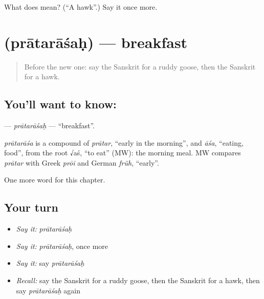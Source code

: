 \begin{tcolorbox}[breakable,colback=teal!4,colframe=teal!35!black,title={Before you move on}]
What does  mean? (\textquotedblleft{}A hawk\textquotedblright{}.) Say it once more.
\end{tcolorbox}
\section[\texorpdfstring{\sk{प्रातराशः} (prātarāśaḥ)}{प्रातराशः (prātarāśaḥ)}]{ (prātarāśaḥ) — breakfast}

\label{lesson:SA-C254-pratarasah}



\begin{quote}
Before the new one: say the Sanskrit for a ruddy goose, then the Sanskrit for a hawk.
\end{quote}

\subsection*{You'll want to know: }
\textbf{} — \emph{prātarāśaḥ} — \textquotedblleft{}breakfast\textquotedblright{}.

\begin{cousinweb}
\emph{prātarāśa} is a compound of \emph{prātar}, \textquotedblleft{}early in the morning\textquotedblright{}, and \emph{āśa}, \textquotedblleft{}eating, food\textquotedblright{}, from the root √aś, \textquotedblleft{}to eat\textquotedblright{} (MW): the morning meal. MW compares \emph{prātar} with Greek \emph{prōi} and German \emph{früh}, \textquotedblleft{}early\textquotedblright{}.
\end{cousinweb}

\begin{grammarlens}[title={What you've built}]
One more word for this chapter.
\end{grammarlens}

\subsection*{Your turn}
\begin{itemize}
\raggedright
  \item \emph{Say it:} \emph{prātarāśaḥ}
  \item \emph{Say it:} \emph{prātarāśaḥ}, once more
  \item \emph{Say it:} say \emph{prātarāśaḥ}
  \item \emph{Recall:} say the Sanskrit for a ruddy goose, then the Sanskrit for a hawk, then say \emph{prātarāśaḥ} again
\end{itemize}

